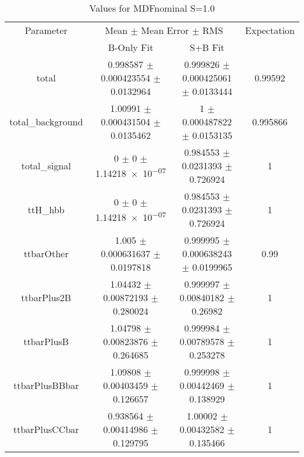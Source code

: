 \begin{table}
\centering
\caption{Values for MDFnominal S=1.0}
\begin{tabular}{cccc}
\toprule
Parameter & \multicolumn{2}{c}{Mean $\pm$ Mean Error $\pm$ RMS} & Expectation\\
 & B-Only Fit & S+B Fit & \\
\midrule
total & \num{0.998587} $\pm$ \num{0.000423554} $\pm$ \num{0.0132964} & \num{0.999826} $\pm$ \num{0.000425061} $\pm$ \num{0.0133444} & \num{0.99592}\\
total\_background & \num{1.00991} $\pm$ \num{0.000431504} $\pm$ \num{0.0135462} & \num{1} $\pm$ \num{0.000487822} $\pm$ \num{0.0153135} & \num{0.995866}\\
total\_signal & \num{0} $\pm$ \num{0} $\pm$ \num{1.14218e-07} & \num{0.984553} $\pm$ \num{0.0231393} $\pm$ \num{0.726924} & \num{1}\\
ttH\_hbb & \num{0} $\pm$ \num{0} $\pm$ \num{1.14218e-07} & \num{0.984553} $\pm$ \num{0.0231393} $\pm$ \num{0.726924} & \num{1}\\
ttbarOther & \num{1.005} $\pm$ \num{0.000631637} $\pm$ \num{0.0197818} & \num{0.999995} $\pm$ \num{0.000638243} $\pm$ \num{0.0199965} & \num{0.99}\\
ttbarPlus2B & \num{1.04432} $\pm$ \num{0.00872193} $\pm$ \num{0.280024} & \num{0.999997} $\pm$ \num{0.00840182} $\pm$ \num{0.26982} & \num{1}\\
ttbarPlusB & \num{1.04798} $\pm$ \num{0.00823876} $\pm$ \num{0.264685} & \num{0.999984} $\pm$ \num{0.00789578} $\pm$ \num{0.253278} & \num{1}\\
ttbarPlusBBbar & \num{1.09808} $\pm$ \num{0.00403459} $\pm$ \num{0.126657} & \num{0.999998} $\pm$ \num{0.00442469} $\pm$ \num{0.138929} & \num{1}\\
ttbarPlusCCbar & \num{0.938564} $\pm$ \num{0.00414986} $\pm$ \num{0.129795} & \num{1.00002} $\pm$ \num{0.00432582} $\pm$ \num{0.135466} & \num{1}\\
\bottomrule
\end{tabular}
\end{table}